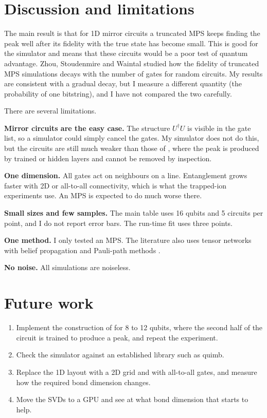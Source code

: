 \documentclass[11pt,a4paper]{article}
\begin{document}
\section{Discussion and limitations}
\label{sec:limits}

The main result is that for 1D mirror circuits a truncated MPS keeps finding the peak well
after its fidelity with the true state has become small. This is good for the simulator and
means that these circuits would be a poor test of quantum advantage. Zhou, Stoudenmire and
Waintal \cite{zhou2020} studied how the fidelity of truncated MPS simulations decays with
the number of gates for random circuits. My results are consistent with a gradual decay, but
I measure a different quantity (the probability of one bitstring), and I have not compared
the two carefully.

There are several limitations.

\textbf{Mirror circuits are the easy case.} The structure $U^\dagger U$ is visible in the
gate list, so a simulator could simply cancel the gates. My simulator does not do this, but
the circuits are still much weaker than those of \cite{aaronson2024,gharibyan2025}, where
the peak is produced by trained or hidden layers and cannot be removed by inspection.

\textbf{One dimension.} All gates act on neighbours on a line. Entanglement grows faster
with 2D or all-to-all connectivity, which is what the trapped-ion experiments use. An MPS is
expected to do much worse there.

\textbf{Small sizes and few samples.} The main table uses 16 qubits and 5 circuits per
point, and I do not report error bars. The run-time fit uses three points.

\textbf{One method.} I only tested an MPS. The literature also uses tensor networks with
belief propagation and Pauli-path methods \cite{gharibyan2025}.

\textbf{No noise.} All simulations are noiseless.

\section{Future work}

\begin{enumerate}
\setlength{\itemsep}{0pt}
\item Implement the construction of \cite{aaronson2024} for 8 to 12 qubits, where the
second half of the circuit is trained to produce a peak, and repeat the experiment.
\item Check the simulator against an established library such as quimb.
\item Replace the 1D layout with a 2D grid and with all-to-all gates, and measure how the
required bond dimension changes.
\item Move the SVDs to a GPU and see at what bond dimension that starts to help.
\end{enumerate}
\end{document}
